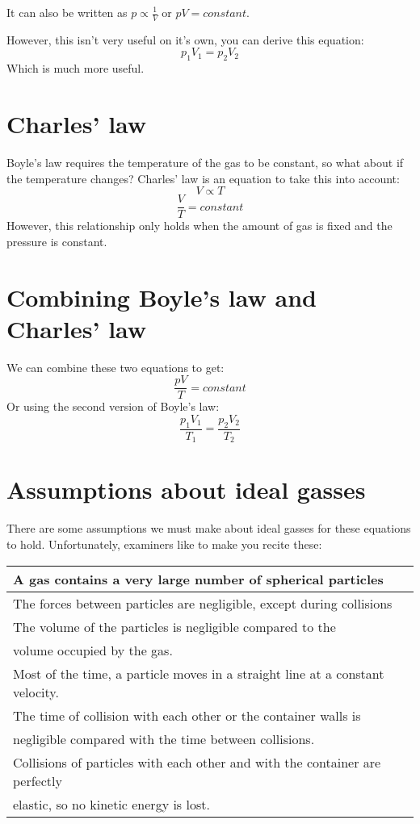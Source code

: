 \documentclass{article}
\begin{document}
It can also be written as $p \propto \frac{1}{V}$ or $pV = constant$.

However, this isn't very useful on it's own, you can derive this equation:
\[
	p_1V_1 = p_2V_2
\]
Which is much more useful.

\section*{Charles' law}
Boyle's law requires the temperature of the gas to be constant, so what about if the temperature changes? Charles' law is an equation to take this into account:
\[
	V \propto T
\]
\[
	\frac{V}{T} = constant
\]
However, this relationship only holds when the amount of gas is fixed and the pressure is constant.

\section*{Combining Boyle's law and Charles' law}
We can combine these two equations to get:
\[
	\frac{pV}{T} = constant
\]
Or using the second version of Boyle's law:
\[
	\frac{p_1V_1}{T_1} = \frac{p_2V_2}{T_2}
\]

\section*{Assumptions about ideal gasses}
There are some assumptions we must make about ideal gasses for these equations to hold. Unfortunately, examiners like to make you recite these:

\begin{center}
\begin{tabular}{|l|} \hline
	A gas contains a very large number of spherical particles \\ \hline
	The forces between particles are negligible, except during collisions \\  \hline
	The volume of the particles is negligible compared to the \\volume occupied by the gas. \\ \hline
	Most of the time, a particle moves in a straight line at a constant velocity.\\The time of collision with each other or the container walls is\\ negligible compared with the time between collisions. \\ \hline
	Collisions of particles with each other and with the container are perfectly\\ elastic, so no kinetic energy is lost. \\ \hline
\end{tabular}
\end{center}
\end{document}
